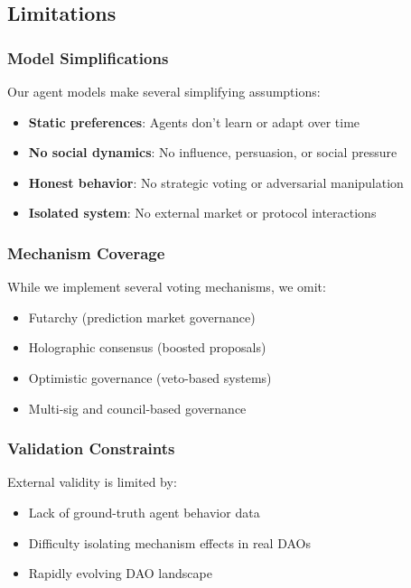 
\subsection{Limitations}

\subsubsection{Model Simplifications}

Our agent models make several simplifying assumptions:

\begin{itemize}
    \item \textbf{Static preferences}: Agents don't learn or adapt over time
    \item \textbf{No social dynamics}: No influence, persuasion, or social pressure
    \item \textbf{Honest behavior}: No strategic voting or adversarial manipulation
    \item \textbf{Isolated system}: No external market or protocol interactions
\end{itemize}

\subsubsection{Mechanism Coverage}

While we implement several voting mechanisms, we omit:

\begin{itemize}
    \item Futarchy (prediction market governance)
    \item Holographic consensus (boosted proposals)
    \item Optimistic governance (veto-based systems)
    \item Multi-sig and council-based governance
\end{itemize}

\subsubsection{Validation Constraints}

External validity is limited by:

\begin{itemize}
    \item Lack of ground-truth agent behavior data
    \item Difficulty isolating mechanism effects in real DAOs
    \item Rapidly evolving DAO landscape
\end{itemize}

